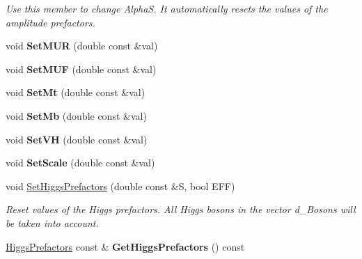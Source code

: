 \begin{DoxyCompactItemize}
\begin{DoxyCompactList}\small\item\em Use this member to change Alpha\-S. It automatically resets the values of the amplitude prefactors. \end{DoxyCompactList}\item 
\hypertarget{classHiggsModel_a40b498b2555458a9abc4ea989e72ce91}{void {\bfseries Set\-M\-U\-R} (double const \&val)}\label{classHiggsModel_a40b498b2555458a9abc4ea989e72ce91}

\item 
\hypertarget{classHiggsModel_a8e8772814f7441352b226eb0566a263e}{void {\bfseries Set\-M\-U\-F} (double const \&val)}\label{classHiggsModel_a8e8772814f7441352b226eb0566a263e}

\item 
\hypertarget{classHiggsModel_a511bd13bf20268e59567b2049d7a5781}{void {\bfseries Set\-Mt} (double const \&val)}\label{classHiggsModel_a511bd13bf20268e59567b2049d7a5781}

\item 
\hypertarget{classHiggsModel_a460c285dbbd117c30be6ea43f5271e2d}{void {\bfseries Set\-Mb} (double const \&val)}\label{classHiggsModel_a460c285dbbd117c30be6ea43f5271e2d}

\item 
\hypertarget{classHiggsModel_a058daf0cc3b8cad4077419d19d8e4c21}{void {\bfseries Set\-V\-H} (double const \&val)}\label{classHiggsModel_a058daf0cc3b8cad4077419d19d8e4c21}

\item 
\hypertarget{classHiggsModel_aaca4ad2dcfd40c87e76fc88ab95b56dc}{void {\bfseries Set\-Scale} (double const \&val)}\label{classHiggsModel_aaca4ad2dcfd40c87e76fc88ab95b56dc}

\item 
void \hyperlink{classHiggsModel_a43f6951291eef31cc18116f7d49f839f}{Set\-Higgs\-Prefactors} (double const \&S, bool E\-F\-F)
\begin{DoxyCompactList}\small\item\em Reset values of the Higgs prefactors. All Higgs bosons in the vector d\-\_\-\-Bosons will be taken into account. \end{DoxyCompactList}\item 
\hypertarget{classHiggsModel_a36b052bac528028a1757554d45901513}{\hyperlink{structHiggsPrefactors}{Higgs\-Prefactors} const \& {\bfseries Get\-Higgs\-Prefactors} () const }\label{classHiggsModel_a36b052bac528028a1757554d45901513}


\end{DoxyCompactItemize}

